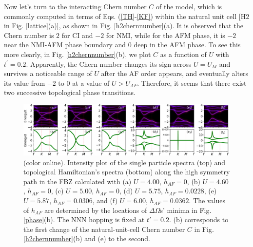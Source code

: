 \documentclass[12pt]{iopart}
\begin{document}
\par Now let's turn to the interacting Chern number $C$ of the model, which is commonly computed in terms of Eqs. (\ref{TH}-\ref{KF}) within the natural unit cell [H2 in Fig. \ref{lattice}(a)], as shown in Fig. \ref{h2chernnumber}(a). It is observed that the Chern number is $2$ for CI and $-2$ for NMI, while for the AFM phase, it is $-2$ near the NMI-AFM phase boundary and $0$ deep in the AFM phase. To see this more clearly, in Fig. \ref{h2chernnumber}(b), we plot $C$ as a function of $U$ with $t^\prime=0.2$. Apparently, the Chern number changes its sign across $U=U_M$ and survives a noticeable range of $U$ after the AF order appears, and eventually alters its value from $-2$ to $0$ at a value of $U>U_{AF}$. Therefore, it seems that there exist two successive topological phase transitions.

\begin{figure}
\centering
\includegraphics[scale=0.45]{h2spectra}
\caption{(color online). Intensity plot of the single particle spectra (top) and topological Hamiltonian's spectra (bottom) along the high symmetry path in the FBZ calculated with (a) $U=4.00$, $h_{AF}=0$, (b) $U=4.60$, $h_{AF}=0$, (c) $U=5.00$, $h_{AF}=0$, (d) $U=5.75$, $h_{AF}=0.0228$, (e) $U=5.87$, $h_{AF}=0.0306$, and (f) $U=6.00$, $h_{AF}=0.0362$. The values of $h_{AF}$ are determined by the locations of $\Delta\Omega$s' minima in Fig. \ref{phase}(b). The NNN hopping is fixed at $t'=0.2$. (b) corresponds to the first change of the natural-unit-cell Chern number $C$ in Fig. \ref{h2chernnumber}(b) and (e) to the second.}\label{h2spectra}
\end{figure}
\end{document}
